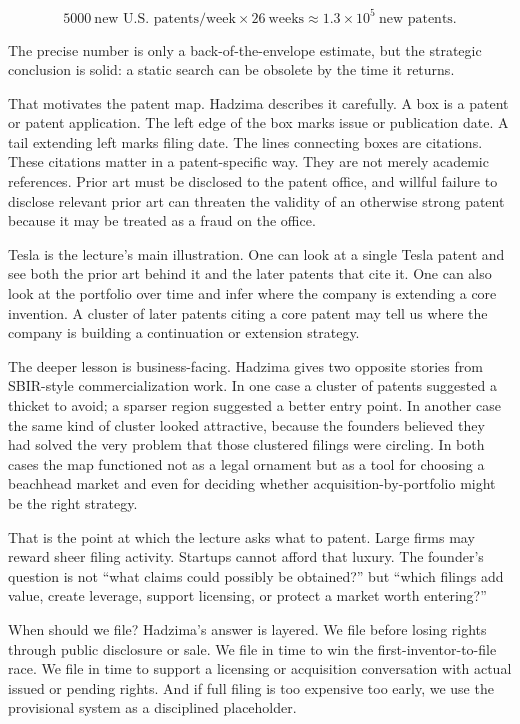 \begin{equation}
5000\ \text{new U.S. patents/week}\times 26\ \text{weeks}\approx 1.3\times 10^5\ \text{new patents}.
\end{equation}

The precise number is only a back-of-the-envelope estimate, but the strategic conclusion is solid: a static search can be obsolete by the time it returns.

That motivates the patent map. Hadzima describes it carefully. A box is a patent or patent application. The left edge of the box marks issue or publication date. A tail extending left marks filing date. The lines connecting boxes are citations. These citations matter in a patent-specific way. They are not merely academic references. Prior art must be disclosed to the patent office, and willful failure to disclose relevant prior art can threaten the validity of an otherwise strong patent because it may be treated as a fraud on the office.

Tesla is the lecture's main illustration. One can look at a single Tesla patent and see both the prior art behind it and the later patents that cite it. One can also look at the portfolio over time and infer where the company is extending a core invention. A cluster of later patents citing a core patent may tell us where the company is building a continuation or extension strategy.

The deeper lesson is business-facing. Hadzima gives two opposite stories from SBIR-style commercialization work. In one case a cluster of patents suggested a thicket to avoid; a sparser region suggested a better entry point. In another case the same kind of cluster looked attractive, because the founders believed they had solved the very problem that those clustered filings were circling. In both cases the map functioned not as a legal ornament but as a tool for choosing a beachhead market and even for deciding whether acquisition-by-portfolio might be the right strategy.

That is the point at which the lecture asks what to patent. Large firms may reward sheer filing activity. Startups cannot afford that luxury. The founder's question is not ``what claims could possibly be obtained?'' but ``which filings add value, create leverage, support licensing, or protect a market worth entering?''

When should we file? Hadzima's answer is layered. We file before losing rights through public disclosure or sale. We file in time to win the first-inventor-to-file race. We file in time to support a licensing or acquisition conversation with actual issued or pending rights. And if full filing is too expensive too early, we use the provisional system as a disciplined placeholder.

